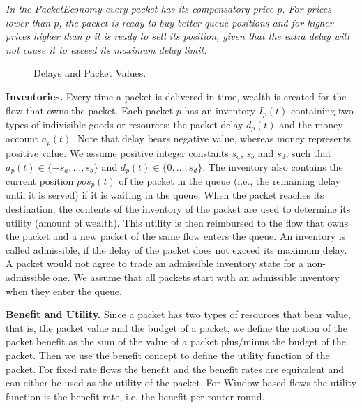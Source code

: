 \documentclass[letterpaper,10pt]{llncs}
\newcommand{\hla}[1]{\hl{#1}}
\renewcommand{\hla}[1]{#1}
\begin{document}
\emph{In the PacketEconomy every packet has its compensatory price $p$. For prices lower than $p$,
the packet is ready to buy better queue positions and for higher prices higher than $p$ it is ready 
to sell its position, given that the extra delay will not cause it to exceed its maximum delay limit.
}

\begin{figure}[!h]
\hspace{0.02\textwidth}
\caption{Delays and Packet Values.} \label{fig:DelayValues}
\end{figure}


\textbf{Inventories.}
Every time a packet is delivered in time, wealth is created for the flow that owns
the packet. Each packet $p$ has an inventory $I_p(t)$ containing two types of indivisible 
goods or resources;
the packet delay $d_p(t)$ and the money account $a_p(t)$.
Note that delay bears negative value, whereas money represents positive value.
We assume positive integer constants $s_a$, $s_b$ and $s_d$, such that 
$a_p(t) \in \{-s_a,\ldots,s_b\}$ and $d_p(t) \in \{0,\dots,s_d\}$. 
The inventory also contains the current position $pos_p(t)$ of the packet in the queue
(i.e., the remaining delay until it is served) if it is waiting in the queue.
When the packet reaches its destination, the contents of
the inventory of the packet are used to determine its utility (amount of wealth).
This utility is then reimbursed to the flow that owns the packet and a new packet
of the same flow enters the queue.
\hla{An inventory is called admissible, if the delay of the packet does not exceed its maximum 
delay. A packet would not agree to trade an admissible inventory state for a non-admissible one.
We assume that all packets start with an admissible inventory when they enter the queue.}

\textbf{Benefit and Utility.}
Since a packet has two types of resources that bear value, that is, the packet value and the budget of a packet,
we define the notion of the packet benefit as the sum of the value of a packet plus/minus the budget of the packet.
Then we use the benefit concept to define the utility function of the packet.
For fixed rate flows the benefit and the benefit rates
are equivalent and can either be used as the utility of the packet.
For Window-based flows the utility function is the benefit rate, i.e. the benefit per router round.
\end{document}
